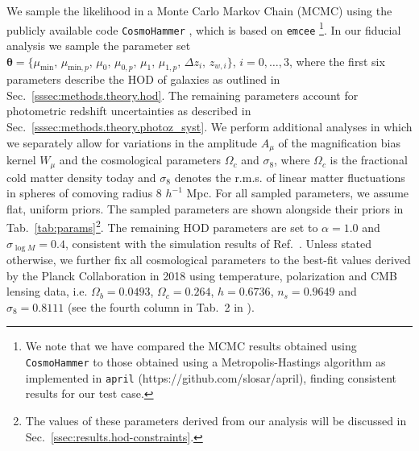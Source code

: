 \documentclass[a4paper,11pt]{article}
\begin{document}
    We sample the likelihood in a Monte Carlo Markov Chain (MCMC) using the publicly available code \texttt{CosmoHammer} \cite{Akeret:2013}, which is based on \texttt{emcee} \cite{Foreman-Mackey2013}\footnote{We note that we have compared the MCMC results obtained using \texttt{CosmoHammer} to those obtained using a Metropolis-Hastings algorithm as implemented in \texttt{april} (https://github.com/slosar/april), finding consistent results for our test case.}. In our fiducial analysis we sample the parameter set $\boldsymbol{\theta} = \{\mu_{\mathrm{min}}, \allowbreak \, \mu_{\mathrm{min}, p}, \allowbreak \, \mu_{0}, \allowbreak \, \mu_{0, p}, \allowbreak \, \mu_{1}, \allowbreak \, \mu_{1, p}, \allowbreak \, \Delta z_{i}, \allowbreak \, z_{w, i}\}$, $i = 0, \dots ,3$, where the first six parameters describe the HOD of galaxies as outlined in Sec.~\ref{sssec:methods.theory.hod}. The remaining parameters account for photometric redshift uncertainties as described in Sec.~\ref{sssec:methods.theory.photoz_syst}. We perform additional analyses in which we separately allow for variations in the amplitude $A_{\mu}$ of the magnification bias kernel $W_{\mu}$ and the cosmological parameters $\Omega_{c}$ and $\sigma_{8}$, where $\Omega_{c}$ is the fractional cold matter density today and $\sigma_{8}$ denotes the r.m.s. of linear matter fluctuations in spheres of comoving radius 8 $h^{-1}$ Mpc. For all sampled parameters, we assume flat, uniform priors. The sampled parameters are shown alongside their priors in Tab.~\ref{tab:params}\footnote{The values of these parameters derived from our analysis will be discussed in Sec.~\ref{ssec:results.hod-constraints}.}. The remaining HOD parameters are set to $\alpha = 1.0$ and $\sigma_{\log M} = 0.4$, consistent with the simulation results of Ref.~\cite{2005ApJ...633..791Z}. Unless stated otherwise, we further fix all cosmological parameters to the best-fit values derived by the Planck Collaboration in 2018 using temperature, polarization and CMB lensing data, i.e. $\Omega_{b}=0.0493$, $\Omega_{c}=0.264$, $h=0.6736$, $n_{s}=0.9649$ and $\sigma_{8}=0.8111$ (see the fourth column in Tab.~2 in \cite{Planck:2018}).
    
\end{document}
